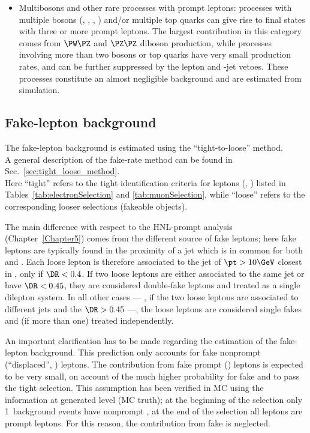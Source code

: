 \begin{itemize}
\item Multibosons and other rare processes with prompt
  leptons:
  processes with multiple bosons (\PW, \PZ, \PGg, \PH) and/or multiple
  top quarks can give rise to final states with three or more prompt
  leptons.
  The largest contribution in this category comes from $\PW\PZ$ and
  $\PZ\PZ$ diboson production, while processes involving more than two
  bosons or top quarks have very small production rates, and can be
  further suppressed by the lepton and \PQb-jet vetoes.
  These processes constitute an almost negligible background and are
  estimated from simulation.
\end{itemize}
 
\subsection{Fake-lepton background}\label{sec_llfakelepton}
The fake-lepton background is estimated using the ``tight-to-loose''
method.\\
A general description of the fake-rate method can be found in
Sec.~\ref{sec:tight_loose_method}.\\

Here ``tight'' refers to the tight identification criteria for
\displ leptons (\ltwo, \lthree) listed in
Tables~\ref{tab:electronSelection} and \ref{tab:muonSelection},
while  ``loose'' refers to the corresponding looser selections
(\ie fakeable objects).

The main difference with respect to the HNL-prompt analysis
(Chapter~\ref{Chapter5}) comes from the different source of fake
leptons; here fake leptons are typically found in the proximity of a
jet which is in common for both \ltwo and \lthree. Each loose
lepton is therefore associated to the jet of $\pt>10\GeV$ closest in
\DR, only if $\DR<0.4$.
If two loose leptons 
are either associated to the same jet or have $\DR<0.45$, they are considered double-fake
leptons and treated as a single dilepton system.
In all other cases --- \ie, if the two loose leptons are associated to
different jets and the $\DR>0.45$ ---,
the loose leptons are considered single fakes and (if more than one)
treated independently.

An important clarification has to be made regarding the estimation of 
the fake-lepton background. This prediction only accounts for fake
nonprompt (``displaced'', \ltwothree) leptons. The contribution from
fake prompt (\ie \lone) leptons is expected to be very small, on
account of the much higher probability for fake \ltwo and \lthree to
pass the tight \displ selection. This assumption has been verified in
MC using the information at generated level (MC truth); at the
beginning of the selection only 1\textperthousand\ background
events have nonprompt \lone, at the end of the selection all \lone
leptons are prompt leptons. 
For this reason, the contribution from fake \lone is neglected.

